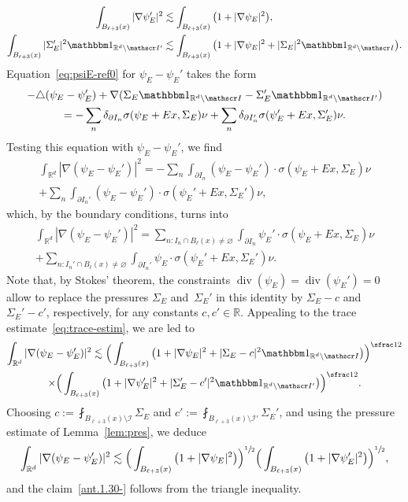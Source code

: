 \documentclass[10pt]{amsart}
\let\mathcal\mathscr
\let\mathds\mathbbm
\theoremstyle{plain}
\theoremstyle{definition}
\newcommand{\R}{\mathbb R}
\newcommand{\Ic}{\mathcal I}
\newcommand{\Div}{{\operatorname{div}}}
\newcommand{\Step}[1]{\Subsubsection*{Step #1}\mbox{}\vspace*{-\baselineskip}}
\begin{document}
\Step{3. Proof of}
\begin{align}
\int_{B_{\ell+3}(x)}|\nabla\psi_E'|^2&\lesssim \int_{B_{\ell+3}(x)}\big(1+|\nabla\psi_E|^2\big),\label{ant.1.30-}\\
\int_{B_{\ell+3}(x)}|\Sigma_E'|^2\mathds1_{\R^d\setminus\Ic'}&\lesssim \int_{B_{\ell+3}(x)}\big(1+|\nabla\psi_E|^2+|\Sigma_E|^2\mathds1_{\R^d\setminus\Ic}\big).\label{ant.1.3}
\end{align}
Equation~\eqref{eq:psiE-ref0} for $\psi_E-\psi_E'$ takes the form
\begin{multline}\label{eq:diff-psi-def}
-\triangle(\psi_E-\psi_E')+\nabla(\Sigma_E\mathds1_{\R^d\setminus\Ic}-\Sigma_E'\mathds1_{\R^d\setminus\Ic'})\\
=-\sum_n\delta_{\partial I_n}\sigma(\psi_E+Ex,\Sigma_E)\nu+\sum_n\delta_{\partial I_n'}\sigma(\psi_E'+Ex,\Sigma_E')\nu.
\end{multline}
Testing this equation with $\psi_E-\psi_E'$, we find
\begin{multline*}
\int_{\R^d}|\nabla(\psi_E-\psi_E')|^2
=-\sum_n\int_{\partial I_n}(\psi_E-\psi_E')\cdot\sigma(\psi_E+Ex,\Sigma_E)\nu\\
+\sum_n\int_{\partial I_n'}(\psi_E-\psi_E')\cdot\sigma(\psi_E'+Ex,\Sigma_E')\nu,
\end{multline*}
which, by the boundary conditions, turns into
\begin{multline}\label{eq:eqn-psi-psi'0}
\int_{\R^d}|\nabla(\psi_E-\psi_E')|^2
=\sum_{n:I_n\cap B_\ell(x)\ne\varnothing}\int_{\partial I_n}\psi_E'\cdot\sigma(\psi_E+Ex,\Sigma_E)\nu\\
+\sum_{n:I_n'\cap B_\ell(x)\ne\varnothing}\int_{\partial I_n'}\psi_E\cdot\sigma(\psi_E'+Ex,\Sigma_E')\nu.
\end{multline}
Note that, by Stokes' theorem, the constraints $\Div(\psi_E)=\Div(\psi_E')=0$ allow to replace the pressures $\Sigma_E$ and~$\Sigma_E'$ in this identity by $\Sigma_E-c$ and $\Sigma_E'-c'$, respectively, for any constants $c,c'\in\R$.
Appealing to the trace estimate~\eqref{eq:trace-estim}, we are led to
\begin{multline*}
\int_{\R^d}|\nabla(\psi_E-\psi_E')|^2
\lesssim \Big(\int_{B_{\ell+3}(x)}\big(1+|\nabla\psi_E|^2+|\Sigma_E-c|^2\mathds1_{\R^d\setminus\Ic}\big)\Big)^{\sfrac12}\\
\times\Big(\int_{B_{\ell+3}(x)}\big(1+|\nabla\psi_E'|^2+|\Sigma_E'-c'|^2\mathds1_{\R^d\setminus\Ic'}\big)\Big)^{\sfrac12}.
\end{multline*}
Choosing $c:=\fint_{B_{\ell+3}(x)\setminus\Ic }\Sigma_E$ and $c':=\fint_{B_{\ell+3}(x)\setminus\Ic'}\Sigma_E'$,
and using the pressure estimate of Lemma~\ref{lem:pres}, we deduce
\begin{equation}\label{eq:preant1.3}
\int_{\R^d}|\nabla(\psi_E-\psi_E')|^2
\lesssim \Big(\int_{B_{\ell+3}(x)}\big(1+|\nabla\psi_E|^2\big)\Big)^{\sfrac12}
\Big(\int_{B_{\ell+3}(x)}\big(1+|\nabla\psi_E'|^2\big)\Big)^{\sfrac12},
\end{equation}
and the claim~\eqref{ant.1.30-} follows from the triangle inequality.
\end{document}
